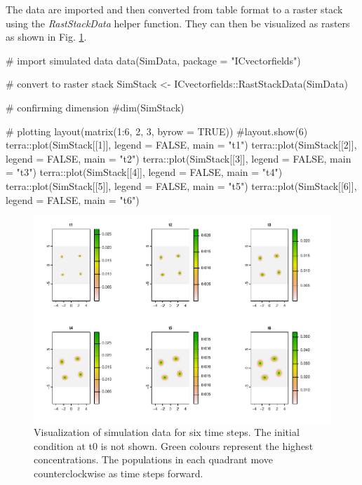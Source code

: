 The data are imported and then converted from table format to a raster
stack using the \emph{RastStackData} helper function. They can then be
visualized as rasters as shown in Fig. \ref{fig:2}.

\begin{Schunk}
\begin{Sinput}
# import simulated data
data(SimData, package = "ICvectorfields")

# convert to raster stack
SimStack <- ICvectorfields::RastStackData(SimData)

# confirming dimension
#dim(SimStack)

# plotting
layout(matrix(1:6, 2, 3, byrow = TRUE))
#layout.show(6)
terra::plot(SimStack[[1]], legend = FALSE, main = "t1")
terra::plot(SimStack[[2]], legend = FALSE, main = "t2")
terra::plot(SimStack[[3]], legend = FALSE, main = "t3")
terra::plot(SimStack[[4]], legend = FALSE, main = "t4")
terra::plot(SimStack[[5]], legend = FALSE, main = "t5")
terra::plot(SimStack[[6]], legend = FALSE, main = "t6")
\end{Sinput}
\begin{figure}
\includegraphics{ImageCorrelationVFv2_files/figure-latex/2-1} \caption[Visualization of simulation data for six time steps]{Visualization of simulation data for six time steps. The initial condition at t0 is not shown. Green colours represent the highest concentrations. The populations in each quadrant move counterclockwise as time steps forward.}\label{fig:2}
\end{figure}
\end{Schunk}

